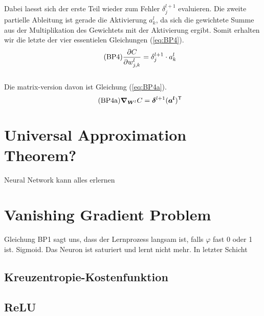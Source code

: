 \\
Dabei laesst sich der erste Teil wieder zum Fehler $\delta_j^{l+1}$ evaluieren.
Die zweite partielle Ableitung ist gerade die Aktivierung $a_k^l$, da sich die
gewichtete Summe aus der Multiplikation des Gewichtets mit der Aktivierung ergibt.
Somit erhalten wir die letzte der vier essentielen Gleichungen (\ref{eq:BP4}).
\begin{equation}\tag{BP4}\label{eq:BP4}
  \frac{\partial C}{\partial w_{j,k}^l} = \delta_j^{l+1} \cdot a_k^l
\end{equation}
\\
Die matrix-version davon ist Gleichung (\ref{eq:BP4a}).
\begin{equation}\tag{BP4a}\label{eq:BP4a}
  \bm{\nabla}_{\bm{W}^l} C = \bm{\delta}^{l+1} (\bm{a^l})^{\mathsf{T}}
\end{equation}


\cite{Nielsen}


\section{Universal Approximation Theorem?}\label{sec:UAT}
Neural Network kann alles erlernen

\section{Vanishing Gradient Problem}

Gleichung BP1 sagt uns, dass der Lernprozess langsam ist, falls $\varphi$ fast 0
oder 1 ist. Sigmoid. Das Neuron ist saturiert und lernt nicht mehr. In letzter Schicht

\subsection{Kreuzentropie-Kostenfunktion}

\subsection{ReLU}

\pagebreak
